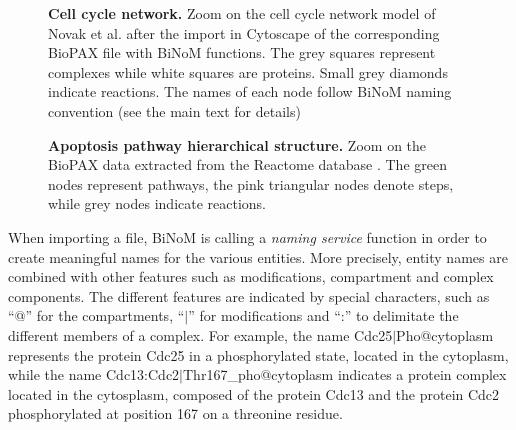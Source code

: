 \documentclass[10pt]{bmc_article}
\newenvironment{bmcformat}{\baselineskip20pt\sloppy\setboolean{publ}{false}}{\baselineskip20pt\sloppy}
\begin{document}
\begin{bmcformat}
\begin{figure}[h]
 \caption{\label{mphasebiopax}  \textbf{Cell cycle network.} Zoom on the cell
cycle network model of Novak et al. \cite{novak1998model} after the import in 
Cytoscape of the corresponding BioPAX file with BiNoM functions. The grey
squares represent complexes while white squares are proteins. Small grey diamonds
indicate reactions. The names of each node follow BiNoM naming convention (see the main text for details)}
\end{figure}

\begin{figure}[h]
 \caption{\label{apoptosishierarchical}  \textbf{Apoptosis pathway hierarchical
structure.} Zoom on the BioPAX data extracted from the Reactome database
\cite{joshi2005reactome}. The green nodes represent pathways, the pink
triangular nodes denote steps, while grey nodes indicate reactions.}
\end{figure}


When importing a file, BiNoM is calling a \emph{naming service} function in
order to create meaningful names for the various entities. More precisely,
entity names are combined with other features such as modifications, compartment
and complex components. The different features are indicated by special
characters, such as ``@'' for the compartments, ``$|$'' for modifications and
``:'' to delimitate the different members of a complex. For example, the
name Cdc25$|$Pho@cytoplasm represents the protein Cdc25 in a phosphorylated
state, located in the cytoplasm, while the name
Cdc13:Cdc2$|$Thr167\_pho@cytoplasm indicates a protein complex located in the
cytosplasm, composed of the protein Cdc13 and the protein Cdc2 phosphorylated at
position 167 on a threonine residue.



\end{bmcformat}
\end{document}
